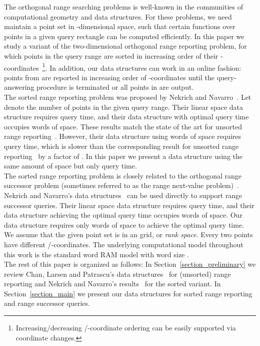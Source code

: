 \documentclass{llncs}
\begin{document}
The orthogonal range searching problems is well-known in the communities of computational geometry and data structures.
For these problems, we need maintain a point set  in -dimensional space,
such that certain functions over points in a given query rectangle  can be computed efficiently.
In this paper we study a variant of the two-dimensional orthogonal range reporting problem,
for which points in the query range are sorted in increasing order of their
-coordinates~\footnote{Increasing/decreasing /-coordinate ordering can be easily supported via coordinate changes.}.
In addition, our data structures can work in an online fashion:
points from  are reported in increasing order of -coordinates
until the query-answering procedure is terminated or all points in  are output. \\
\indent The sorted range reporting problem was proposed by Nekrich and Navarro~\cite{DBLP:conf/swat/NekrichN12}.
Let  denote the number of points in the given query range.
Their linear space data structure requires  query time,
and their data structure with optimal query time occupies  words of space.
These results match the state of the art for unsorted range reporting~\cite{DBLP:conf/compgeom/ChanLP11}.
However, their data structure using  words of space requires  query time,
which is slower than the corresponding result for unsorted range reporting~\cite{DBLP:conf/compgeom/ChanLP11} by a factor of .
In this paper we present a data structure using the same amount of space but only  query time. \\
\indent The sorted range reporting problem is closely related to the orthogonal range successor problem
(sometimes referred to as the range next-value problem)~\cite{DBLP:conf/stacs/IliopoulosCKRW08,DBLP:journals/comgeo/YuHW11,DBLP:conf/swat/NekrichN12}.
Nekrich and Navarro's data structures~\cite{DBLP:conf/swat/NekrichN12} can be used directly to support range successor queries.
Their linear space data structure requires  query time,
and their data structure achieving the optimal  query time occupies  words of space.
Our data structure requires only  words of space to achieve the optimal query time. \\
\indent We assume that the given point set is in an  grid, or \emph{rank space}.
Every two points have different /-coordinates.
The underlying computational model throughout this work is the standard word RAM model with word size . \\
\indent The rest of this paper is organized as follows:
In Section~\ref{section_preliminary} we review Chan, Larsen and Patrascu's data structures~\cite{DBLP:conf/compgeom/ChanLP11} for (unsorted) range reporting
and Nekrich and Navarro's results~\cite{DBLP:conf/swat/NekrichN12} for the sorted variant.
In Section~\ref{section_main} we present our data structures for sorted range reporting and range successor queries.
\end{document}

